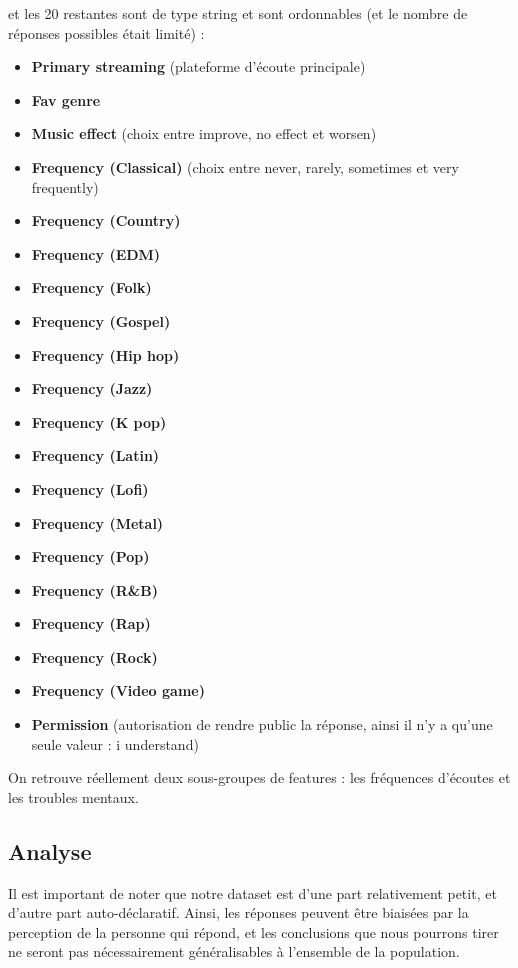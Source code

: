 \documentclass[
]{article}
\providecommand{\tightlist}{%
  \setlength{\itemsep}{0pt}\setlength{\parskip}{0pt}}
\begin{document}
et les 20 restantes sont de type string et sont ordonnables (et le
nombre de réponses possibles était limité) :

\begin{itemize}
\tightlist
\item
  \textbf{Primary streaming} (plateforme d'écoute principale)
\item
  \textbf{Fav genre}
\item
  \textbf{Music effect} (choix entre improve, no effect et worsen)
\item
  \textbf{Frequency (Classical)} (choix entre never, rarely, sometimes
  et very frequently)
\item
  \textbf{Frequency (Country)}
\item
  \textbf{Frequency (EDM)}
\item
  \textbf{Frequency (Folk)}
\item
  \textbf{Frequency (Gospel)}
\item
  \textbf{Frequency (Hip hop)}
\item
  \textbf{Frequency (Jazz)}
\item
  \textbf{Frequency (K pop)}
\item
  \textbf{Frequency (Latin)}
\item
  \textbf{Frequency (Lofi)}
\item
  \textbf{Frequency (Metal)}
\item
  \textbf{Frequency (Pop)}
\item
  \textbf{Frequency (R\&B)}
\item
  \textbf{Frequency (Rap)}
\item
  \textbf{Frequency (Rock)}
\item
  \textbf{Frequency (Video game)}
\item
  \textbf{Permission} (autorisation de rendre public la réponse, ainsi
  il n'y a qu'une seule valeur : i understand)
\end{itemize}

On retrouve réellement deux sous-groupes de features : les fréquences
d'écoutes et les troubles mentaux.

\hypertarget{analyse}{%
\subsection{Analyse}\label{analyse}}

Il est important de noter que notre dataset est d'une part relativement
petit, et d'autre part auto-déclaratif. Ainsi, les réponses peuvent être
biaisées par la perception de la personne qui répond, et les conclusions
que nous pourrons tirer ne seront pas nécessairement généralisables à
l'ensemble de la population.
\end{document}

